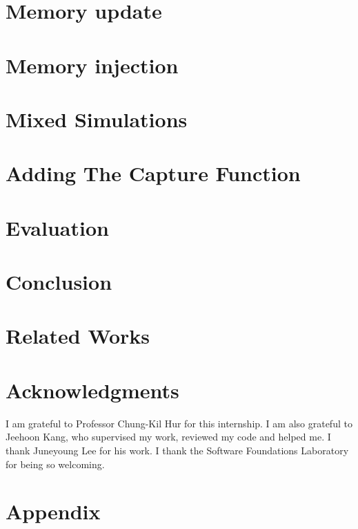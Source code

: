 \documentclass{llncs2e/llncs}
\begin{document}
\section{Memory update}

\section{Memory injection}

\section{Mixed Simulations}

\section{Adding The Capture Function}


\section{Evaluation}


\section{Conclusion}


\section{Related Works}


\section*{Acknowledgments}
I am grateful to Professor Chung-Kil Hur for this internship. I am also grateful to Jeehoon Kang, who supervised my work, reviewed my code and helped me. I thank Juneyoung Lee for his work. I thank the Software Foundations Laboratory for being so welcoming.


%
%
\newpage
\nocite{*}



\newpage
\section{Appendix}

\end{document}
